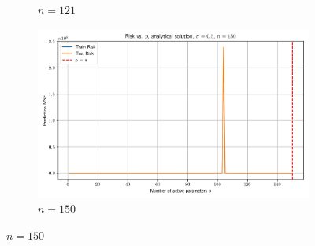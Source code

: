 \documentclass[twoside,10pt]{article}
\begin{document}
\begin{figure}[htb]
\begin{subfigure}[b]{\imgwidth}
    \caption{$n=121$}\label{fig:2k}
  \end{subfigure}%
  \hfill
  \begin{subfigure}[b]{\imgwidth}
    \includegraphics[width=\linewidth]{img2/risk_curve_n150.png}
    \caption{$n=150$}\label{fig:2l}
  \end{subfigure}

  \medskip


\end{figure}
\end{document}
